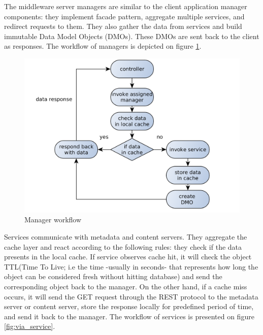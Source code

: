 The middleware server managers are similar to the client application manager components: they implement facade pattern, aggregate multiple services, and redirect requests to them. They also gather the data from services and build immutable Data Model Objects (DMOs). These DMOs are sent back to the client as responses. The workflow of managers is depicted on figure \ref{fig:via_manager}.

\begin{figure}[h]
    \centering
	\includegraphics[width=\textwidth]{images/via_manager_1.png}
    \caption{Manager workflow}
    \label{fig:via_manager}
\end{figure}

Services communicate with metadata and content servers. They aggregate the cache layer and react according to the following rules: they check if the data presents in the local cache. If service observes cache hit, it will check the object TTL(Time To Live; i.e the time -usually in seconds- that represents how long the object can be considered fresh without hitting database) and send the corresponding object back to the manager. On the other hand, if a cache miss occurs, it will send the GET request through the REST protocol to the metadata server or content server, store the response locally for predefined period of time, and send it back to the manager. The workflow of services is presented on figure \ref{fig:via_service}.


